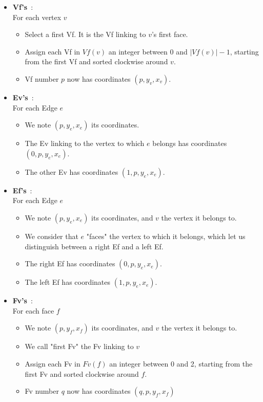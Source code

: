 \documentclass{article}
\begin{document}
\begin{itemize}
	\item \textbf{Vf's}~:\\
	For each vertex $v$
	\begin{itemize}[noitemsep, nosep, label=-]
		\item Select a first Vf. It is the Vf linking to $v$'s first face.
		\item Assign each Vf in $Vf(v)$ an integer between 0 and $|Vf(v)|-1$, starting from the first Vf and sorted clockwise around $v$.
		\item Vf number $p$ now has coordinates $(p, y_v, x_v)$.
	\end{itemize}
	
	\item \textbf{Ev's}~:\\
	For each Edge $e$ 
	\begin{itemize}[noitemsep, nosep, label=-]
		\item We note $(p, y_e, x_e)$ its coordinates.
		\item The Ev linking to the vertex to which $e$ belongs has coordinates $(0, p, y_e, x_e)$.
		\item The other Ev has coordinates $(1, p, y_e, x_e)$.
	\end{itemize}
	
	\item \textbf{Ef's}~:\\
	For each Edge $e$ 
	\begin{itemize}[noitemsep, nosep, label=-]
		\item We note $(p, y_e, x_e)$ its coordinates, and $v$ the vertex it belongs to.
		\item We consider that $e$ "faces" the vertex to which it belongs, which let us distinguish between a right Ef and a left Ef.
		\item The right Ef has coordinates $(0, p, y_e, x_e)$.
		\item The left Ef has coordinates $(1, p, y_e, x_e)$.
	\end{itemize}
	
	\item \textbf{Fv's}~:\\
	For each face $f$ 
	\begin{itemize}[noitemsep, nosep, label=-]
		\item We note $(p, y_f, x_f)$ its coordinates, and $v$ the vertex it belongs to.
		\item We call "first Fv" the Fv linking to $v$
		\item Assign each Fv in $Fv(f)$ an integer between 0 and 2, starting from the first Fv and sorted clockwise around $f$.
		\item Fv number $q$ now has coordinates $(q, p, y_f, x_f)$
	\end{itemize}
	

\end{itemize}
\end{document}
